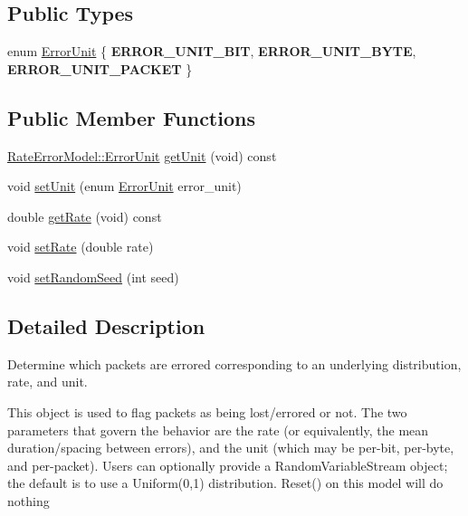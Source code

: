 \subsection*{Public Types}
\begin{DoxyCompactItemize}
\item 
enum \hyperlink{classRateErrorModel_a66989ad0447c35a7890873abdcdb1481}{Error\+Unit} \{ {\bfseries E\+R\+R\+O\+R\+\_\+\+U\+N\+I\+T\+\_\+\+B\+IT}, 
{\bfseries E\+R\+R\+O\+R\+\_\+\+U\+N\+I\+T\+\_\+\+B\+Y\+TE}, 
{\bfseries E\+R\+R\+O\+R\+\_\+\+U\+N\+I\+T\+\_\+\+P\+A\+C\+K\+ET}
 \}
\end{DoxyCompactItemize}
\subsection*{Public Member Functions}
\begin{DoxyCompactItemize}
\item 
\hyperlink{classRateErrorModel_a66989ad0447c35a7890873abdcdb1481}{Rate\+Error\+Model\+::\+Error\+Unit} \hyperlink{classRateErrorModel_aa25737500139ddf320ae447bc14d6234}{get\+Unit} (void) const 
\item 
void \hyperlink{classRateErrorModel_ab5280ff459e202bdb68efcd39188d40b}{set\+Unit} (enum \hyperlink{classRateErrorModel_a66989ad0447c35a7890873abdcdb1481}{Error\+Unit} error\+\_\+unit)
\item 
double \hyperlink{classRateErrorModel_a593e311b2c347c8a25872d6c4d4d87c1}{get\+Rate} (void) const 
\item 
void \hyperlink{classRateErrorModel_a0f43c7f2becb900c1f24f6594e0e3185}{set\+Rate} (double rate)
\item 
void \hyperlink{classRateErrorModel_ae2fce882f90916838728ff838cd36451}{set\+Random\+Seed} (int seed)
\end{DoxyCompactItemize}


\subsection{Detailed Description}
Determine which packets are errored corresponding to an underlying distribution, rate, and unit. 

This object is used to flag packets as being lost/errored or not. The two parameters that govern the behavior are the rate (or equivalently, the mean duration/spacing between errors), and the unit (which may be per-\/bit, per-\/byte, and per-\/packet). Users can optionally provide a Random\+Variable\+Stream object; the default is to use a Uniform(0,1) distribution. Reset() on this model will do nothing

